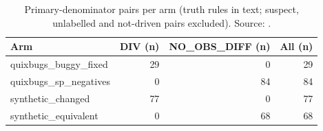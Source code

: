 \begin{table}[t]
\centering\scriptsize
\caption{Primary-denominator pairs per arm (truth rules in text; suspect, unlabelled and not-driven pairs excluded). Source: .}
\label{tab:datasets}
\begin{tabular}{lrrr}
\hline
Arm & DIV (n) & NO\_OBS\_DIFF (n) & All (n) \\
\hline
quixbugs\_buggy\_fixed & 29 & 0 & 29 \\
quixbugs\_sp\_negatives & 0 & 84 & 84 \\
synthetic\_changed & 77 & 0 & 77 \\
synthetic\_equivalent & 0 & 68 & 68 \\
\hline
\end{tabular}
\end{table}
